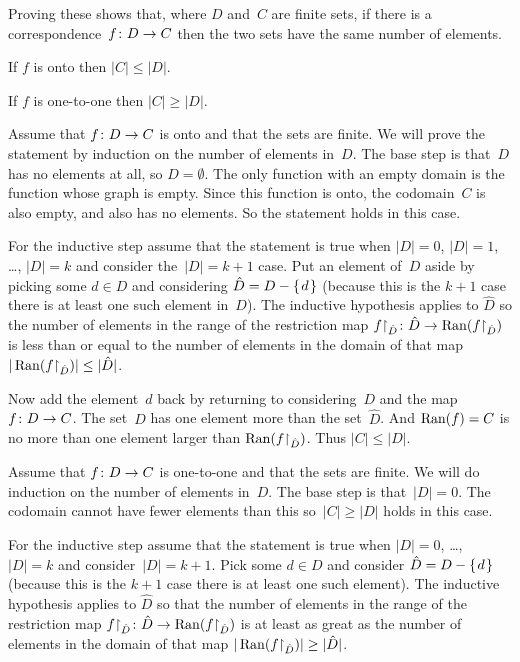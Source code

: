 \documentclass{ibl}
\begin{document}
\begin{ex} Proving these shows that, where $D$ and~$C$ are finite sets, 
  if there is a correspondence~$\mbox{$f\colon D\to C$}$
  then the two sets have the same number of elements.
\begin{exes}
\item If $f$ is onto then $|C|\leq |D|$.
\item If $f$ is one-to-one then $|C|\geq |D|$.
\end{exes}
\begin{ans}
\begin{exes}
\item Assume that $\mbox{$f\colon D\to C$}$ is onto and
  that the sets are finite.
  We will prove the statement by induction on the number of elements in~$D$.
  The base step is that~$D$ has no elements at all, so $D=\emptyset$.
  The only function with an empty domain is the function whose graph is 
  empty. 
  Since this function is onto, the codomain~$C$ is also empty, 
  and also has no elements.
  So the statement holds in this case.

  For the inductive step assume that the statement is true when $|D|=0$, 
  $|D|=1$, \ldots, $|D|=k$ and consider the~$|D|=k+1$ case.
  Put an element of~$D$ aside by picking some $d\in D$ and considering 
  $\hat{D}=D-\mbox{$\{\hspace{0.1em}d\hspace{0.1em}\}$}$ (because this is the $k+1$ case there is at least
  one such element in~$D$).
  The inductive hypothesis applies to $\hat{D}$ so the number of elements in
  the range of the restriction map 
  $\mbox{${f}\mathord\upharpoonright_{\hat{D}}\colon \hat{D}\to \operatorname{Ran}({f}\mathord\upharpoonright_{\hat{D}})$}$
  is less than or equal to the number of elements in the domain of that map
  $|\operatorname{Ran}({f}\mathord\upharpoonright_{\hat{D}})|\leq |\hat{D}|$.

  Now add the element~$d$ back by returning to considering~$D$ and the 
  map~$\mbox{$f\colon D\to C$}$.
  The set~$D$ has one element more than the set~$\hat{D}$.
  And $\operatorname{Ran}(f)=C$ is no more than one element larger than
  $\operatorname{Ran}({f}\mathord\upharpoonright_{\hat{D}})$.
  Thus $|C|\leq|D|$.
\item Assume that $\mbox{$f\colon D\to C$}$ is one-to-one and
  that the sets are finite.
  We will do induction on the number of elements in~$D$.
  The base step is that~$|D|=0$.
  The codomain cannot have fewer elements than this
  so~$|C|\geq |D|$ holds in this case.

  For the inductive step assume that the statement is true when $|D|=0$, 
  \ldots, $|D|=k$ and consider~$|D|=k+1$.
  Pick some $d\in D$ and consider 
  $\hat{D}=D-\mbox{$\{\hspace{0.1em}d\hspace{0.1em}\}$}$ (because this is the $k+1$ case there is at least
  one such element).
  The inductive hypothesis applies to $\hat{D}$ so that 
  the number of elements in the range of the restriction map 
  $\mbox{${f}\mathord\upharpoonright_{\hat{D}}\colon \hat{D}\to \operatorname{Ran}({f}\mathord\upharpoonright_{\hat{D}})$}$
  is at least as great as the number of elements in the domain of that map
  $|\operatorname{Ran}({f}\mathord\upharpoonright_{\hat{D}})|\geq |\hat{D}|$.


\end{exes}
\end{ans}
\end{ex}
\end{document}
